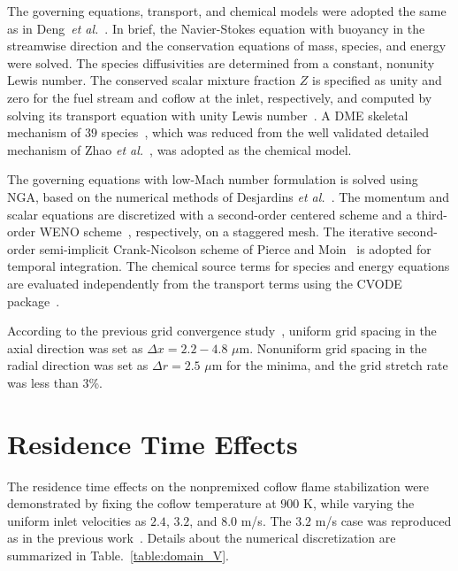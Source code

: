 \documentclass{wssci}
\begin{document}
The governing equations, transport, and chemical models were adopted the same as in Deng~\emph{et al.}~\cite{deng15}.  In brief, the Navier-Stokes equation with buoyancy in the streamwise direction and the conservation equations of mass, species, and energy were solved.  The species diffusivities are determined from a constant, nonunity Lewis number.  The conserved scalar mixture fraction $Z$ is specified as unity and zero for the fuel stream and coflow at the inlet, respectively, and computed by solving its transport equation with unity Lewis number~\cite{pitsch98b}.  A DME skeletal mechanism of $39$ species~\cite{bhagatwala15}, which was reduced from the well validated detailed mechanism of Zhao \emph{et al.}~\cite{zhao08}, was adopted as the chemical model.

The governing equations with low-Mach number formulation is solved using NGA, based on the numerical methods of Desjardins \emph{et al.}~\cite{desjardins08}.  The momentum and scalar equations are discretized with a second-order centered scheme and a third-order WENO scheme~\cite{liu94}, respectively, on a staggered mesh.  The iterative second-order semi-implicit Crank-Nicolson scheme of Pierce and Moin~\cite{pierce01} is adopted for temporal integration.  The chemical source terms for species and energy equations are evaluated independently from the transport terms using the CVODE package~\cite{cohen96}.

According to the previous grid convergence study~\cite{deng15}, uniform grid spacing in the axial direction was set as $\Delta x = 2.2-4.8$ $\mu$m.  Nonuniform grid spacing in the radial direction was set as $\Delta r = 2.5$ $\mu$m for the minima, and the grid stretch rate was less than $3$\%.    
\section{Residence Time Effects}

The residence time effects on the nonpremixed coflow flame stabilization were demonstrated by fixing the coflow temperature at $900$ K, while varying the uniform inlet velocities as $2.4$, $3.2$, and $8.0$ m/s.  The $3.2$ m/s case was reproduced as in the previous work~\cite{deng15}.  Details about the numerical discretization are summarized in Table.~\ref{table:domain_V}.

\begin{table}
  \caption{Computational domain and number of grid points.}
  \label{table:domain_V}
  \centering
  \normalsize
\end{table}
\end{document}
